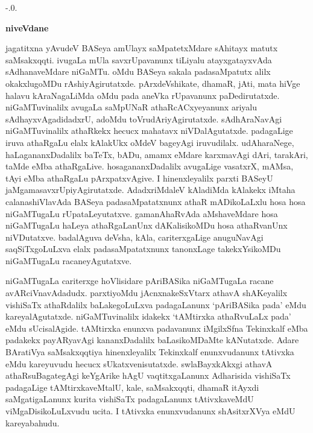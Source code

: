 -.0.\begin{center}
{\Huge\bfseries niveVdane}
\end{center}

\bigskip

jagatitxna yAvudeV BASeya amUlayx saMpatetxMdare sAhitayx matutx saMsakxqqti. ivugaLa mUla savxrUpavanunx tiLiyalu atayxgatayxvAda sAdhanaveMdare niGaMTu. oMdu BASeya sakala padasaMpatutx alilx okakxlugoMDu rAshiyAgirutatxde. pArxdeVshikate, dhamaR, jAti, mata hiVge halavu kAraNagaLiMda oMdu pada aneVka rUpavanunx paDedirutatxde. niGaMTuvinalilx avugaLa saMpUNaR athaRcACxyeyanunx ariyalu sAdhayxvAgadidadxrU, adoMdu toVrudAriyAgirutatxde. sAdhAraNavAgi niGaMTuvinalilx athaRkekx hecucx mahatavx niVDalAgutatxde. padagaLige iruva athaRgaLu elalx kAlakUkx oMdeV bageyAgi iruvudilalx. udAharaNege, haLagananxDadalilx baTeTx, bADu, amamx eMdare karxmavAgi dAri, tarakAri, taMde eMba athaRgaLive. hosagananxDadalilx avugaLige vasatxrX, mAMsa, tAyi eMba athaRgaLu pArxpatxvAgive. I hinenxleyalilx parxti BASeyU jaMgamasavxrUpiyAgirutatxde. AdadxriMdaleV kAladiMda kAlakekx iMtaha calanashiVlavAda BASeya padasaMpatatxnunx athaR mADikoLaLxlu hosa hosa niGaMTugaLu rUpataLeyutatxve. gamanAhaRvAda aMshaveMdare hosa niGaMTugaLu haLeya athaRgaLanUnx dAKalisikoMDu hosa athaRvanUnx niVDutatxve. badalAguva deVsha, kAla, cariterxgaLige anuguNavAgi saqSiTxgoLuLxva elalx padasaMpatatxnunx tanonxLage takekxYsikoMDu niGaMTugaLu racaneyAgutatxve.

\smallskip

niGaMTugaLa cariterxge hoVlisidare pAriBASika niGaMTugaLa racane avARciVnavAdadudx. parxtiyoMdu jAcnxnakeSxVtarx athavA shAKeyalilx vishiSaTx athaRdalilx baLakegoLuLxva padagaLanunx `pAriBASika pada'  eMdu kareyalAgutatxde. niGaMTuvinalilx idakekx `tAMtirxka athaRvuLaLx pada' eMdu sUcisalAgide. tAMtirxka enunxva padavanunx iMgilxSfna Tekinxkalf eMba padakekx payARyavAgi kananxDadalilx baLasikoMDaMte kANutatxde. Adare BAratiVya saMsakxqqtiya hinenxleyalilx Tekinxkalf enunxvudanunx tAtivxka eMdu kareyuvudu hecucx sUkatxvenisutatxde.  swlaBayxkAkxgi  athavA athaRsuBagategAgi  keYgArike hAgU vaqtitxgaLanunx Adharisida vishiSaTx padagaLige  tAMtirxkaveMtalU, kale, saMsakxqqti, dhamaR itAyxdi saMgatigaLanunx kurita vishiSaTx padagaLanunx tAtivxkaveMdU viMgaDisikoLuLxvudu ucita. I tAtivxka enunxvudanunx shAsitxrXVya eMdU  kareyabahudu. 

